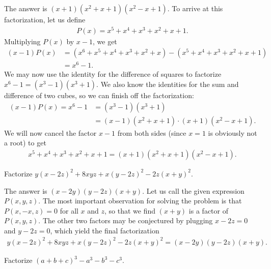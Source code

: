 \documentclass[12pt,a4paper]{memoir}
\theoremstyle{definition}
\begin{document}
	\begin{solution}
		The answer is $(x+1)(x^2+x+1)(x^2-x+1)$. To arrive at this factorization, let us define
		\begin{align*}
			P(x) = x^5+x^4+x^3+x^2+x+1.
		\end{align*}
		Multiplying $P(x)$ by $x-1$, we get
		\begin{align*}
			(x-1)P(x) &= (x^6+x^5+x^4+x^3+x^2+x) - (x^5+x^4+x^3+x^2+x+1)\\
			&= x^6 - 1.
		\end{align*}
		We may now use the identity for the difference of squares to factorize $x^6 - 1 = (x^3-1)(x^3+1)$. We also know the identities for the sum and difference of two cubes, so we can finish off the factorization:
		\begin{align*}
			(x-1)P(x) = x^6-1 &= (x^3-1)(x^3+1)\\
			&= (x-1)(x^2+x+1) \cdot (x+1)(x^2-x+1).
		\end{align*}
		We will now cancel the factor $x-1$ from both sides (since $x=1$ is obviously not a root) to get 
		\begin{align*}
			x^5+x^4+x^3+x^2+x+1 = (x+1)(x^2+x+1)(x^2-x+1).
		\end{align*}
	\end{solution}
	
%	
	\setcounter{question}{73}
	\begin{tcolorbox}
		\begin{question}
			Factorize $y(x-2z)^2 + 8xyz + x(y-2z)^2 - 2z (x+y)^2$.
		\end{question}
	\end{tcolorbox}
	
	\begin{solution}
		The answer is $(x-2y)(y-2z)(x+y)$. Let us call the given expression $P(x,y,z)$. The most important observation for solving the problem is that $P(x,-x,z)=0$ for all $x$ and $z$, so that we find $(x+y)$ is a factor of $P(x,y,z)$. The other two factors may be conjectured by plugging $x-2z=0$ and $y-2z=0$, which yield the final factorization
		\begin{align*}
			y(x-2z)^2 + 8xyz + x(y-2z)^2 - 2z (x+y)^2 = (x-2y)(y-2z)(x+y).
		\end{align*}
	\end{solution}
	
	
	
	
	\begin{tcolorbox}
		\SetupExSheets{headings=runin}
		\begin{question}
			Factorize $(a+b+c)^3 - a^3 - b^3 - c^3$.
		\end{question}
	\end{tcolorbox}
	
\end{document}

